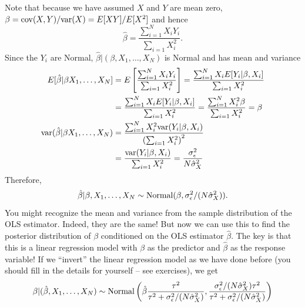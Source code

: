 Note that because we have assumed $X$ and $Y$ are mean zero, $\beta = {\rm cov}(X,Y)/{\rm var}(X) = E[XY]/E[X^2]$ and hence
\begin{equation}
\hat{\beta} = \frac{\sum_{i=1}^NX_iY_i}{\sum_{i=1}X_i^2}. 
\end{equation}
Since the $Y_i$ are Normal, $\hat{\beta}|(\beta,X_1,\dots,X_N)$ is Normal and has mean and variance
\begin{align}
E[\hat{\beta}|\beta X_1,\dots,X_N]&= E\left[\frac{\sum_{i=1}^NX_iY_i}{\sum_{i=1}X_i^2}  \right] =\frac{\sum_{i=1}^NX_i E[Y_i|\beta,X_i]}{\sum_{i=1}X_i^2}\\
&= \frac{\sum_{i=1}^NX_i E[Y_i|\beta,X_i]}{\sum_{i=1}X_i^2} =  \frac{\sum_{i=1}^NX_i^2 \beta}{\sum_{i=1}X_i^2} = \beta\\
{\rm var}(\hat{\beta}|\beta X_1,\dots,X_N) &= \frac{\sum_{i=1}^NX_i^2 {\rm var}(Y_i|\beta,X_i)}{\left(\sum_{i=1}X_i^2\right)^2}\\
&=  \frac{{\rm var}(Y_i|\beta,X_i)}{\sum_{i=1}X_i^2} = \frac{\sigma_{\epsilon}^2}{N\hat{\sigma}_X^2}
\end{align}
Therefore, 
\begin{equation}
\hat{\beta}|\beta,X_1,\dots,X_N \sim {\rm Normal}(\beta,\sigma_{\epsilon}^2/(N\hat{\sigma}_X^2)). 
\end{equation}
You might recognize the mean and variance from the sample distribution of the OLS estimator. Indeed, they are the same! But now we can use this to find the posterior distribution of $\beta$ conditioned on the OLS estimator $\hat{\beta}$. 
The key is that this is a linear regression model with $\beta$ as the predictor and $\hat{\beta}$ as the response variable!  If we ``invert'' the linear regression model as we have done before (you should fill in the details for yourself -- see exercises), we get
\begin{equation}\label{eq:bayes_lr_posterior}
\beta|(\hat{\beta},X_1,\dots,X_N) \sim {\rm Normal}\left( \hat{\beta}\frac{\tau^2}{\tau^2 + \sigma_{\epsilon}^2/(N\hat{\sigma}_X^2)},\frac{\sigma_{\epsilon}^2/(N\hat{\sigma}_X^2)\tau^2}{\tau^2 + \sigma_{\epsilon}^2/(N\hat{\sigma}_X^2)}\right)
\end{equation}



